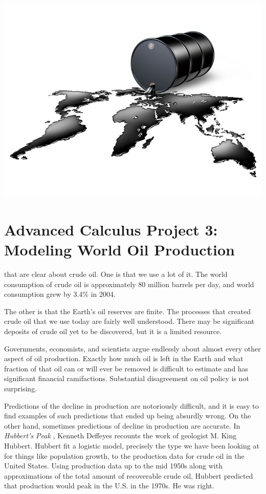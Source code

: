 \documentclass
[justified,nohyper]
{tufte-handout}
\begin{document}
\begin{center}
\includegraphics[scale=0.3]{oil.jpg}
\end{center}
\section{Advanced Calculus Project 3: Modeling World Oil Production}
 that are clear about crude oil. One is that we 
use a lot of it. The world consumption of crude oil is approximately 80 million 
barrels per day, and world consumption grew by 3.4\% in 2004.

The other is that the Earth's oil reserves are finite. The processes that
created crude oil that we use today are fairly well understood. There may be 
significant deposits of crude oil yet to be discovered, but it is a limited 
resource.

Governments, economists, and scientists argue endlessly about almost every other 
aspect of oil production. Exactly how much oil is left in the Earth and what 
fraction of that oil can or will ever be removed is difficult to estimate and 
has significant financial ramifactions. Substantial disagreement on oil policy 
is not surprising.

Predictions of the decline in production are notoriously difficult, and it is 
easy to find examples of such predictions that ended up being absurdly wrong.
 On the other hand, sometimes 
predictions of decline in production are accurate. In \textit{Hubbert's Peak}
, Kenneth Deffeyes recounts the work of geologist M. 
King Hubbert. Hubbert fit a logistic model, precisely the type we have been 
looking at for things like population growth, to the production data for crude 
oil in the United States. Using production data up to the mid 1950s along with 
approximations of the total amount of recoverable crude oil, Hubbert predicted 
that production would peak in the U.S. in the 1970s. He was right.
\end{document}
